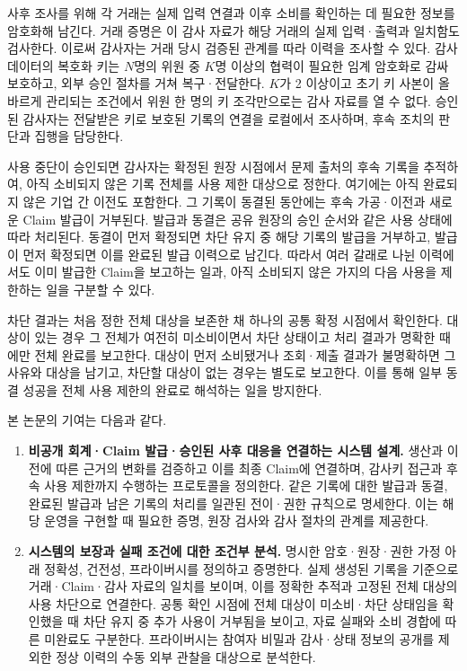 사후 조사를 위해 각 거래는 실제 입력 연결과 이후 소비를 확인하는 데 필요한 정보를 암호화해 남긴다.
거래 증명은 이 감사 자료가 해당 거래의 실제 입력·출력과 일치함도 검사한다.
이로써 감사자는 거래 당시 검증된 관계를 따라 이력을 조사할 수 있다.
감사 데이터의 복호화 키는 $N$명의 위원 중 $K$명 이상의 협력이 필요한 임계 암호화로 감싸 보호하고, 외부 승인 절차를 거쳐 복구·전달한다.
$K$가 2 이상이고 초기 키 사본이 올바르게 관리되는 조건에서 위원 한 명의 키 조각만으로는 감사 자료를 열 수 없다.
승인된 감사자는 전달받은 키로 보호된 기록의 연결을 로컬에서 조사하며, 후속 조치의 판단과 집행을 담당한다.

사용 중단이 승인되면 감사자는 확정된 원장 시점에서 문제 출처의 후속 기록을 추적하여, 아직 소비되지 않은 기록 전체를 사용 제한 대상으로 정한다.
여기에는 아직 완료되지 않은 기업 간 이전도 포함한다.
그 기록이 동결된 동안에는 후속 가공·이전과 새로운 Claim 발급이 거부된다.
발급과 동결은 공유 원장의 승인 순서와 같은 사용 상태에 따라 처리된다.
동결이 먼저 확정되면 차단 유지 중 해당 기록의 발급을 거부하고, 발급이 먼저 확정되면 이를 완료된 발급 이력으로 남긴다.
따라서 여러 갈래로 나뉜 이력에서도 이미 발급한 Claim을 보고하는 일과, 아직 소비되지 않은 가지의 다음 사용을 제한하는 일을 구분할 수 있다.

차단 결과는 처음 정한 전체 대상을 보존한 채 하나의 공통 확정 시점에서 확인한다.
대상이 있는 경우 그 전체가 여전히 미소비이면서 차단 상태이고 처리 결과가 명확한 때에만 전체 완료를 보고한다.
대상이 먼저 소비됐거나 조회·제출 결과가 불명확하면 그 사유와 대상을 남기고, 차단할 대상이 없는 경우는 별도로 보고한다.
이를 통해 일부 동결 성공을 전체 사용 제한의 완료로 해석하는 일을 방지한다.

본 논문의 기여는 다음과 같다.
\begin{enumerate}
    \item \textbf{비공개 회계·Claim 발급·승인된 사후 대응을 연결하는 시스템 설계.}
          생산과 이전에 따른 근거의 변화를 검증하고 이를 최종 Claim에 연결하며, 감사키 접근과 후속 사용 제한까지 수행하는 프로토콜을 정의한다.
          같은 기록에 대한 발급과 동결, 완료된 발급과 남은 기록의 처리를 일관된 전이·권한 규칙으로 명세한다.
          이는 해당 운영을 구현할 때 필요한 증명, 원장 검사와 감사 절차의 관계를 제공한다.
    \item \textbf{시스템의 보장과 실패 조건에 대한 조건부 분석.}
          명시한 암호·원장·권한 가정 아래 정확성, 건전성, 프라이버시를 정의하고 증명한다.
          실제 생성된 기록을 기준으로 거래·Claim·감사 자료의 일치를 보이며, 이를 정확한 추적과 고정된 전체 대상의 사용 차단으로 연결한다.
          공통 확인 시점에 전체 대상이 미소비·차단 상태임을 확인했을 때 차단 유지 중 추가 사용이 거부됨을 보이고, 자료 실패와 소비 경합에 따른 미완료도 구분한다.
          프라이버시는 참여자 비밀과 감사·상태 정보의 공개를 제외한 정상 이력의 수동 외부 관찰을 대상으로 분석한다.
\end{enumerate}

